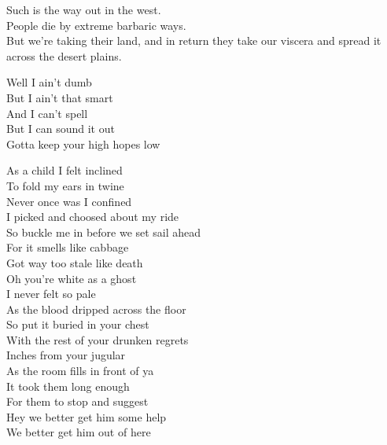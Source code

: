 Such is the way out in the west.\\
People die by extreme barbaric ways.\\
But we're taking their land, and in return they take our viscera and spread it across the desert plains.\\




Well I ain't dumb\\
But I ain't that smart\\
And I can't spell\\
But I can sound it out\\

Gotta keep your high hopes low\\




As a child I felt inclined\\
To fold my ears in twine\\
Never once was I confined\\
I picked and choosed about my ride\\
So buckle me in before we set sail ahead\\
For it smells like cabbage\\
Got way too stale like death\\

Oh you're white as a ghost\\
I never felt so pale\\
As the blood dripped across the floor\\

So put it buried in your chest\\
With the rest of your drunken regrets\\
Inches from your jugular\\
As the room fills in front of ya\\
It took them long enough\\
For them to stop and suggest\\
Hey we better get him some help\\
We better get him out of here\\

